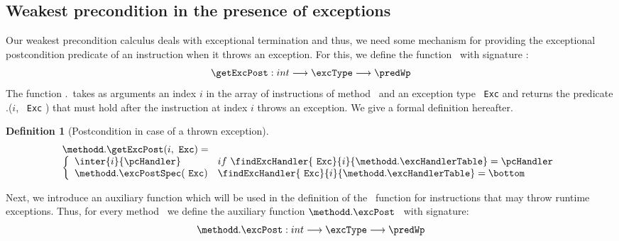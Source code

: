 \newtheorem{defExc}{Definition}[subsection]
\newtheorem{defExcRuntime}[defExc]{Definition}%
\subsection{Weakest precondition in the presence of exceptions } \label{wp:Exc} %
Our weakest precondition calculus deals with exceptional termination and thus, we need
some mechanism for providing the exceptional postcondition predicate of an instruction 
when it throws an exception. 
For this, we define the function \getExcPost \  with signature :
 $$\getExcPost : int   \longrightarrow \excType \longrightarrow  \predWp  $$
The function \methodd.\getExcPost \ 
takes as arguments an index $i$ in the array of instructions of method \methodd \ and an exception type
 \mbox{ \rm \texttt{Exc}}  and returns the predicate \methodd.\getExcPost($i$, \mbox{ \rm \texttt{Exc}}   )
  that must hold after the instruction at index $i$ throws an exception. We give a formal definition hereafter.


\begin{defExc}[Postcondition in case of a thrown exception]\label{defExc}
$$  \begin{array}{l}
           \methodd.\getExcPost(i, \mbox{ \rm \texttt{Exc}}   ) = \\
   \left\{\begin{array}{ll}
        \inter{i}{\pcHandler}   & if \  \findExcHandler{\mbox{ \rm \texttt{Exc}} }{i}{\methodd.\excHandlerTable} = \pcHandler \\
	\methodd.\excPostSpec( \mbox{ \rm \texttt{Exc}}  ) & \findExcHandler{\mbox{ \rm \texttt{Exc}} }{i}{\methodd.\excHandlerTable} = \bottom 
  \end{array}\right.
\end{array}
$$
\end{defExc}

Next, we introduce an auxiliary function which will be used in the definition of the \fwpi \ function for instructions
that may throw runtime exceptions.
Thus, for every method \methodd \  we define  the auxiliary function $ \methodd.\excPost $ \ with signature:
$$\methodd.\excPost : int   \longrightarrow \excType \longrightarrow  \predWp  $$
 
